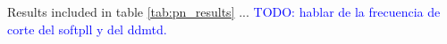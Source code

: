 Results included in table \ref{tab:pn_results} ... \textcolor{blue}{TODO: hablar de la frecuencia de corte del softpll y del ddmtd.}

%         
%         
%         
    
